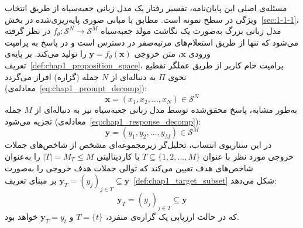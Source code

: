 مسئله‌ی اصلی این پایان‌نامه، تفسیر رفتار یک مدل زبانی جعبه‌سیاه از طریق انتخاب ویژگی در سطح نمونه است. مطابق با مبانی صوری پایه‌ریزی‌شده در بخش~\ref{sec:1-1-1}، مدل زبانی بزرگ به‌صورت یک نگاشت مولد جعبه‌سیاه $f_\theta: \mathcal{S}^N \to \mathcal{S}^M$ در نظر گرفته می‌شود که تنها از طریق استعلام‌های مرتبه‌صفر در دسترس است و در پاسخ به پرامپت ورودی $\mathbf{x}$، متن خروجی $\mathbf{y} = f_\theta(\mathbf{x})$ را تولید می‌کند. بر پایه‌ی تعریف~\ref{def:chap1_proposition_space}، پرامپت خام کاربر از طریق عملگر تقطیع نحوی $\Pi$ به دنباله‌ای از $N$ جمله (گزاره) افراز می‌گردد (معادله‌ی~\ref{eq:chap1_prompt_decomp}):
\begin{equation}\label{eq:chap4_prompt_def}
    \mathbf{x} = (x_1, x_2, \dots, x_N) \in \mathcal{S}^N
\end{equation}
به‌طور مشابه، پاسخ محقق‌شده توسط مدل زبانی جعبه‌سیاه نیز به دنباله‌ای از $M$ جمله تجزیه می‌شود (معادله‌ی~\ref{eq:chap1_response_decomp}):
\begin{equation}\label{eq:chap4_response_def}
    \mathbf{y} = (y_1, y_2, \dots, y_M) \in \mathcal{S}^M
\end{equation}
در این سناریوی انتساب، تحلیل‌گر زیرمجموعه‌ای مشخص از شاخص‌های جملات خروجی مورد نظر با عنوان $T \subseteq \{1, 2, \dots, M\}$ با کاردینالیتی $|T| = M_T \le M$ را به‌عنوان شاخص‌های هدف تعیین می‌کند که توالی جملات هدف خروجی را به‌صورت $\mathbf{y}_T = {(y_j)}_{j \in T} \subseteq \mathbf{y}$ بر مبنای تعریف~\ref{def:chap1_target_subset} شکل می‌دهد:
\begin{equation}\label{eq:chap4_target_def}
    \mathbf{y}_T = {(y_j)}_{j \in T} \subseteq \mathbf{y}
\end{equation}
که در حالت ارزیابی یک گزاره‌ی منفرد، $T = \{t\}$ و $\mathbf{y}_T = y_t$ خواهد بود.

